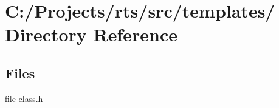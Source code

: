 \section{C\-:/\-Projects/rts/src/templates/ Directory Reference}
\label{dir_c68d91cfdadf1af4c2d39bbcf928e432}
\subsection*{Files}
\begin{DoxyCompactItemize}
\item 
file \hyperlink{class_8h}{class.\-h}
\end{DoxyCompactItemize}
